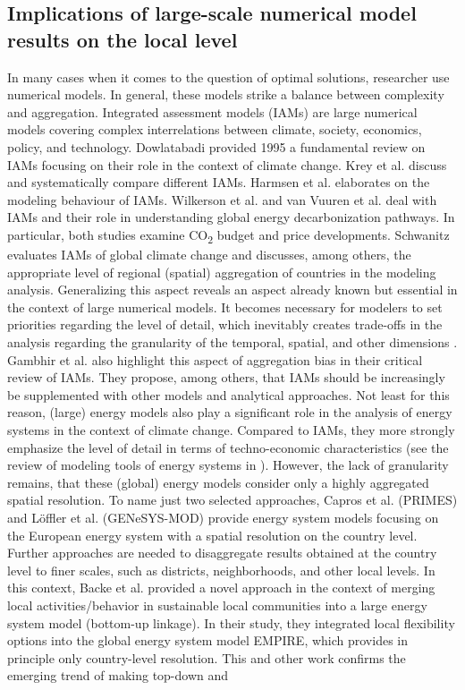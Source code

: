 \subsection{Implications of large-scale numerical model results on the local level}
In many cases when it comes to the question of optimal solutions, researcher use numerical models. In general, these models strike a balance between complexity and aggregation. Integrated assessment models (IAMs) are large numerical models covering complex interrelations between climate, society, economics, policy, and technology. Dowlatabadi \cite{dowlatabadi1995integrated} provided 1995 a fundamental review on IAMs focusing on their role in the context of climate change. Krey et al. \cite{krey2019looking} discuss and systematically compare different IAMs. Harmsen et al. \cite{harmsen2021integrated} elaborates on the modeling behaviour of IAMs. Wilkerson et al. \cite{wilkerson2015comparison} and van Vuuren et al. \cite{van2016carbon} deal with IAMs and their role in understanding global energy decarbonization pathways. In particular, both studies examine CO\textsubscript{2} budget and price developments. Schwanitz \cite{schwanitz2013evaluating} evaluates IAMs of global climate change and discusses, among others, the appropriate level of regional (spatial) aggregation of countries in the modeling analysis. Generalizing this aspect reveals an aspect already known but essential in the context of large numerical models. It becomes necessary for modelers to set priorities regarding the level of detail, which inevitably creates trade-offs in the analysis regarding the granularity of the temporal, spatial, and other dimensions \cite{gargiulo2013long}. Gambhir et al. \cite{gambhir2019review} also highlight this aspect of aggregation bias in their critical review of IAMs. They propose, among others, that IAMs should be increasingly be supplemented with other models and analytical approaches. Not least for this reason, (large) energy models also play a significant role in the analysis of energy systems in the context of climate change. Compared to IAMs, they more strongly emphasize the level of detail in terms of techno-economic characteristics (see the review of modeling tools of energy systems in \cite{ringkjob2018review}). However, the lack of granularity remains, that these (global) energy models consider only a highly aggregated spatial resolution. To name just two selected approaches, Capros et al. \cite{capros2012model} (PRIMES) and Löffler et al. \cite{loffler2017designing} (GENeSYS-MOD) provide energy system models focusing on the European energy system with a spatial resolution on the country level. Further approaches are needed to disaggregate results obtained at the country level to finer scales, such as districts, neighborhoods, and other local levels. In this context, Backe et al. \cite{backe2021heat} provided a novel approach in the context of merging local activities/behavior in sustainable local communities into a large energy system model (bottom-up linkage). In their study, they integrated local flexibility options into the global energy system model EMPIRE, which provides in principle only country-level resolution. This and other work confirms the emerging trend of making top-down and 